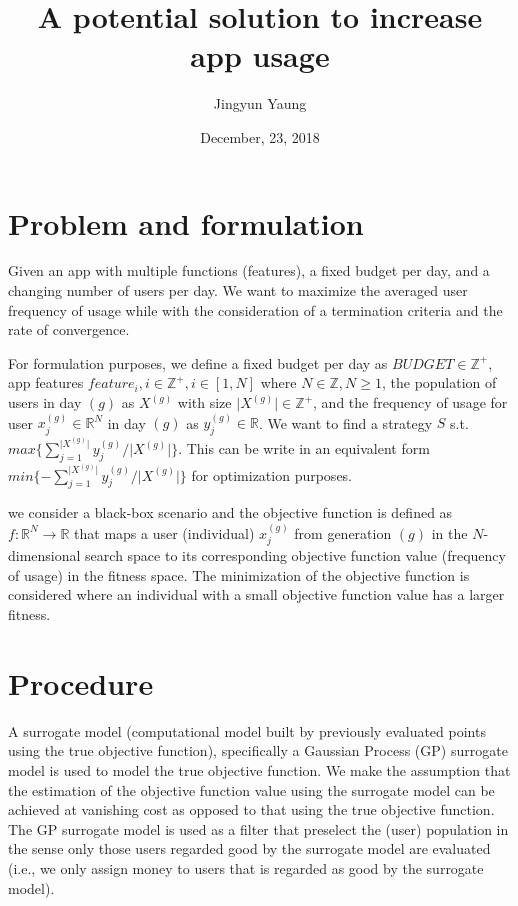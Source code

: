 \documentclass{article}
\title{A potential solution to increase app usage}
\author{Jingyun Yaung }
\date{December, 23, 2018}
\begin{document}
\maketitle

\section{Problem and formulation}
Given an app with multiple functions (features), a fixed budget per day, and a changing number of users per day. We want to maximize the averaged user frequency of usage while with the consideration of a termination criteria and the rate of convergence.

For formulation purposes, we define a fixed budget per day as $BUDGET \in \mathbb{Z}^+$, app features $feature_i, i \in \mathbb{Z}^+ ,i \in [1,N]$ where $N \in \mathbb{Z},N \geq 1$, the population of users in day $(g)$ as $X^{(g)}$ with size $\vert X^{(g)} \vert \in \mathbb{Z}^+$, and the frequency of usage for user $x_j^{(g)}\in \mathbb{R}^N$ in day $(g)$  as $y_j^{(g)} \in \mathbb{R}$. We want to find a strategy $S$ s.t. $max \{ \sum_{j=1}^{\vert X^{(g)} \vert }y_j^{(g)}/\vert X^{(g)} \vert \}$. This can be write in an equivalent form $min\{ -\sum_{j=1}^{\vert X^{(g)} \vert }y_j^{(g)}/\vert X^{(g)} \vert \}$ for optimization purposes.


we consider a black-box scenario and the objective function is defined as $f: \mathbb{R}^N \rightarrow \mathbb{R}$ that maps a user (individual) $x_j^{(g)}$ from generation $(g)$ in the $N$-dimensional search space to its corresponding objective function value (frequency of usage) in the fitness space. The minimization of the objective function is considered where an individual with a small objective function value has a larger fitness.






\section{Procedure}

A surrogate model (computational model built by previously evaluated points using the true objective function), specifically a Gaussian Process (GP) surrogate model \cite{Murphy:2012:MLP:2380985}\cite{rasmussen2004gaussian}  is used to model the true objective function. We make the assumption that the estimation of the objective function value using the surrogate model can be achieved at vanishing cost as opposed to that using the true objective function. The GP surrogate model is used as a filter that preselect the (user) population in the sense only those users regarded good by the surrogate model are evaluated (i.e., we only assign money to users that is regarded as good by the surrogate model). 
\end{document}
